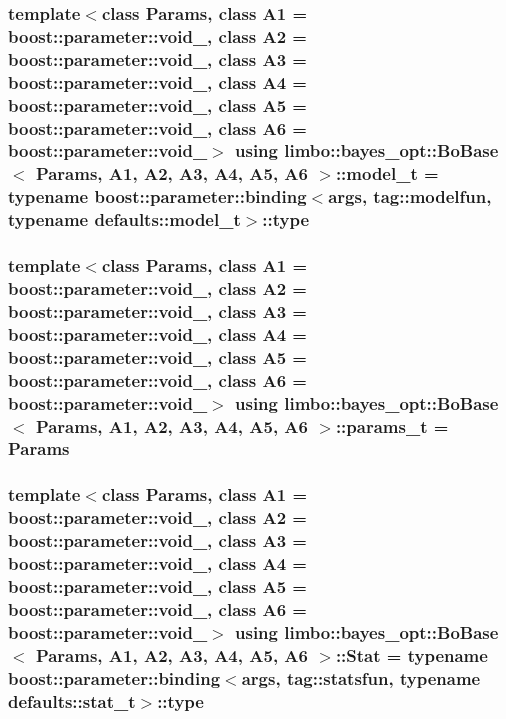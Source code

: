 \subsubsection[{\texorpdfstring{model\+\_\+t}{model_t}}]{\setlength{\rightskip}{0pt plus 5cm}template$<$class Params, class A1 = boost\+::parameter\+::void\+\_\+, class A2 = boost\+::parameter\+::void\+\_\+, class A3 = boost\+::parameter\+::void\+\_\+, class A4 = boost\+::parameter\+::void\+\_\+, class A5 = boost\+::parameter\+::void\+\_\+, class A6 = boost\+::parameter\+::void\+\_\+$>$ using {\bf limbo\+::bayes\+\_\+opt\+::\+Bo\+Base}$<$ Params, A1, A2, A3, A4, A5, A6 $>$\+::{\bf model\+\_\+t} =  typename boost\+::parameter\+::binding$<${\bf args}, tag\+::modelfun, typename {\bf defaults\+::model\+\_\+t}$>$\+::type}\hypertarget{classlimbo_1_1bayes__opt_1_1_bo_base_a5e23d523dd2a16b866a2660721b937bb}{}\label{classlimbo_1_1bayes__opt_1_1_bo_base_a5e23d523dd2a16b866a2660721b937bb}
\subsubsection[{\texorpdfstring{params\+\_\+t}{params_t}}]{\setlength{\rightskip}{0pt plus 5cm}template$<$class Params, class A1 = boost\+::parameter\+::void\+\_\+, class A2 = boost\+::parameter\+::void\+\_\+, class A3 = boost\+::parameter\+::void\+\_\+, class A4 = boost\+::parameter\+::void\+\_\+, class A5 = boost\+::parameter\+::void\+\_\+, class A6 = boost\+::parameter\+::void\+\_\+$>$ using {\bf limbo\+::bayes\+\_\+opt\+::\+Bo\+Base}$<$ Params, A1, A2, A3, A4, A5, A6 $>$\+::{\bf params\+\_\+t} =  Params}\hypertarget{classlimbo_1_1bayes__opt_1_1_bo_base_ad64c1fe61c97f4540914018439f96a0a}{}\label{classlimbo_1_1bayes__opt_1_1_bo_base_ad64c1fe61c97f4540914018439f96a0a}
\subsubsection[{\texorpdfstring{Stat}{Stat}}]{\setlength{\rightskip}{0pt plus 5cm}template$<$class Params, class A1 = boost\+::parameter\+::void\+\_\+, class A2 = boost\+::parameter\+::void\+\_\+, class A3 = boost\+::parameter\+::void\+\_\+, class A4 = boost\+::parameter\+::void\+\_\+, class A5 = boost\+::parameter\+::void\+\_\+, class A6 = boost\+::parameter\+::void\+\_\+$>$ using {\bf limbo\+::bayes\+\_\+opt\+::\+Bo\+Base}$<$ Params, A1, A2, A3, A4, A5, A6 $>$\+::{\bf Stat} =  typename boost\+::parameter\+::binding$<${\bf args}, tag\+::statsfun, typename {\bf defaults\+::stat\+\_\+t}$>$\+::type}\hypertarget{classlimbo_1_1bayes__opt_1_1_bo_base_a4dfe2a37a52a4a964bce83cc580bff2e}{}\label{classlimbo_1_1bayes__opt_1_1_bo_base_a4dfe2a37a52a4a964bce83cc580bff2e}
